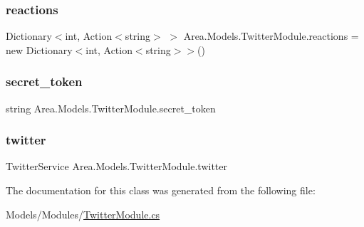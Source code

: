 \subsubsection{\texorpdfstring{reactions}{reactions}}
{\footnotesize\ttfamily Dictionary$<$int, Action$<$string$>$ $>$ Area.\+Models.\+Twitter\+Module.\+reactions = new Dictionary$<$int, Action$<$string$>$$>$()\hspace{0.3cm}{\ttfamily [private]}}

\mbox{\label{classArea_1_1Models_1_1TwitterModule_ad21df823c729272d61536f84e8c74616}} 
\subsubsection{\texorpdfstring{secret\+\_\+token}{secret\_token}}
{\footnotesize\ttfamily string Area.\+Models.\+Twitter\+Module.\+secret\+\_\+token}

\mbox{\label{classArea_1_1Models_1_1TwitterModule_a7ebe89d232b1da290dec450921d988d1}} 
\subsubsection{\texorpdfstring{twitter}{twitter}}
{\footnotesize\ttfamily Twitter\+Service Area.\+Models.\+Twitter\+Module.\+twitter\hspace{0.3cm}{\ttfamily [private]}}



The documentation for this class was generated from the following file\+:\begin{DoxyCompactItemize}
\item 
Models/\+Modules/\mbox{\hyperlink{TwitterModule_8cs}{Twitter\+Module.\+cs}}\end{DoxyCompactItemize}
